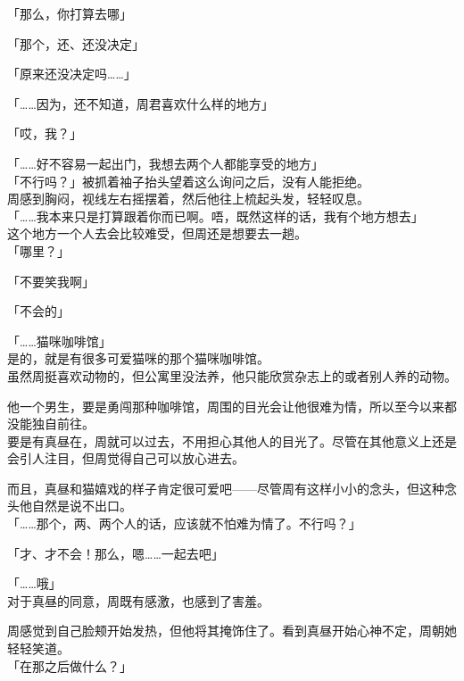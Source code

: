 「那么，你打算去哪」

「那个，还、还没决定」

「原来还没决定吗……」

「……因为，还不知道，周君喜欢什么样的地方」

「哎，我？」

「……好不容易一起出门，我想去两个人都能享受的地方」\\

「不行吗？」被抓着袖子抬头望着这么询问之后，没有人能拒绝。\\

周感到胸闷，视线左右摇摆着，然后他往上梳起头发，轻轻叹息。\\

「……我本来只是打算跟着你而已啊。唔，既然这样的话，我有个地方想去」\\

这个地方一个人去会比较难受，但周还是想要去一趟。\\

「哪里？」

「不要笑我啊」

「不会的」

「……猫咪咖啡馆」\\

是的，就是有很多可爱猫咪的那个猫咪咖啡馆。\\

虽然周挺喜欢动物的，但公寓里没法养，他只能欣赏杂志上的或者别人养的动物。

他一个男生，要是勇闯那种咖啡馆，周围的目光会让他很难为情，所以至今以来都没能独自前往。\\

要是有真昼在，周就可以过去，不用担心其他人的目光了。尽管在其他意义上还是会引人注目，但周觉得自己可以放心进去。

而且，真昼和猫嬉戏的样子肯定很可爱吧——尽管周有这样小小的念头，但这种念头他自然是说不出口。\\

「……那个，两、两个人的话，应该就不怕难为情了。不行吗？」

「才、才不会！那么，嗯……一起去吧」

「……哦」\\

对于真昼的同意，周既有感激，也感到了害羞。

周感觉到自己脸颊开始发热，但他将其掩饰住了。看到真昼开始心神不定，周朝她轻轻笑道。\\

「在那之后做什么？」

